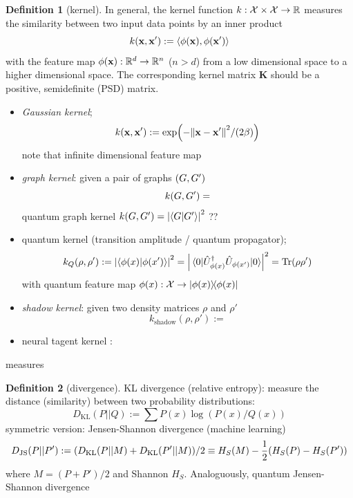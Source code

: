 \documentclass[
10pt,
aps,
pra,
linenumbers,
floatfix,
]{revtex4-2}
\theoremstyle{plain}
\theoremstyle{definition}
\newtheorem{definition}{Definition}
\newcommand{\kernel}{k}
\newcommand{\jsd}{D_\text{JS}}
\newcommand{\kl}{D_\text{KL}}
\newcommand{\shadow}{\text{shadow}}
\newcommand{\U}{\hat{U}}
\begin{document}
\begin{definition}[kernel]\label{def:kernel}
	In general, the kernel function $\kernel:\mathcal{X}\times \mathcal{X} \to \realnumber$ measures the similarity between two input data points by an inner product
	\begin{equation}
		\kernel (\vbx,\vbx') : = \expval{\phi(\vbx),\phi(\vbx')}
	\end{equation}
	with the feature map $\phi(\vb{x}): \mathbb{R}^d\to \mathbb{R}^n$ ($n > d$) from a low dimensional space to a higher dimensional space.
	The corresponding kernel matrix $\mathbf{K}$ should be a positive, semidefinite (PSD) matrix.
	\begin{itemize}
		\item \emph{Gaussian kernel}; 
		\begin{equation}
			\kernel(\vbx,\vbx') := \exp(-\norm{\vbx-\vbx'}^2/(2\beta))
		\end{equation}
		note that infinite dimensional feature map

		\item \emph{graph kernel}: given a pair of graphs $(G,G')$
		\begin{equation}
			\kernel (\graph,\graph')  =
		\end{equation}
		quantum graph kernel $\kernel (\graph,\graph')  = \abs{\ip{\graph}{\graph'}}^2$ ??

		\item quantum kernel (transition amplitude / quantum propagator);
		\begin{equation}
			k_Q(\rho,\rho') := \abs{\ip{\phi(x)}{\phi(x')}}^2 =\abs{\mel{0}{\U_{\phi(x)}^\dagger \U_{\phi(x')} }{0}}^2 = \Tr(\rho\rho')
		\end{equation}
		with quantum feature map $\phi(x): \mathcal{X}\to \op{\phi(x)}$

		\item \emph{shadow kernel}:
		given two density matrices $\rho$ and $\rho'$
		\begin{equation}
			k_{\shadow}(\rho,\rho') := 
		\end{equation}

		\item neural tagent kernel \cite{jacotNeuralTangentKernel2020}:
	\end{itemize}
\end{definition}
measures
\begin{definition}[divergence]\label{def:divergence}
	KL divergence (relative entropy): measure the distance (similarity) between two probability distributions:
	\begin{equation}
		\kl (P || Q) := \sum P(x) \log (P(x)/Q(x))
	\end{equation}
	symmetric version: Jensen-Shannon divergence (machine learning)
	\begin{equation}
		\jsd (P || P') := \qty(\kl(P|| M) + \kl(P'||M))/2
		\equiv H_S(M)-\frac{1}{2} (H_S(P) - H_S(P') ) 
	\end{equation}
	where $M=(P+P')/2$ and Shannon  $H_S$.
	Analoguously, quantum Jensen-Shannon divergence
\end{definition}
\end{document}
